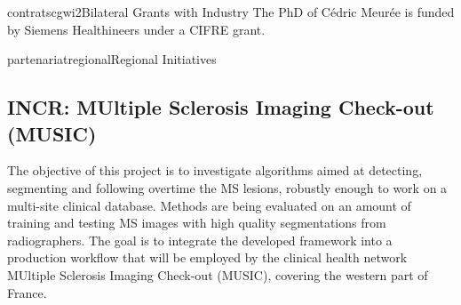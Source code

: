 \documentclass{ra2018}
\begin{document}
\begin{module}{contrats}{cgwi2}{Bilateral Grants with Industry}
The PhD of Cédric Meurée is funded by Siemens Healthineers under a CIFRE grant. 
\end{module}



\begin{module}{partenariat}{regional}{Regional Initiatives}

\subsection{INCR: MUltiple Sclerosis Imaging Check-out (MUSIC)}
    \begin{participants}
    \end{participants}
The objective of this project is to investigate algorithms aimed at detecting, segmenting and following overtime the MS lesions, robustly enough to work on a multi-site clinical database. Methods are being evaluated on an amount of training and testing MS images with high quality segmentations from radiographers.
The goal is to integrate the developed framework into a production workflow that will be employed by the clinical health network MUltiple Sclerosis Imaging Check-out (MUSIC), covering the western part of France.

\end{module}
\end{document}
